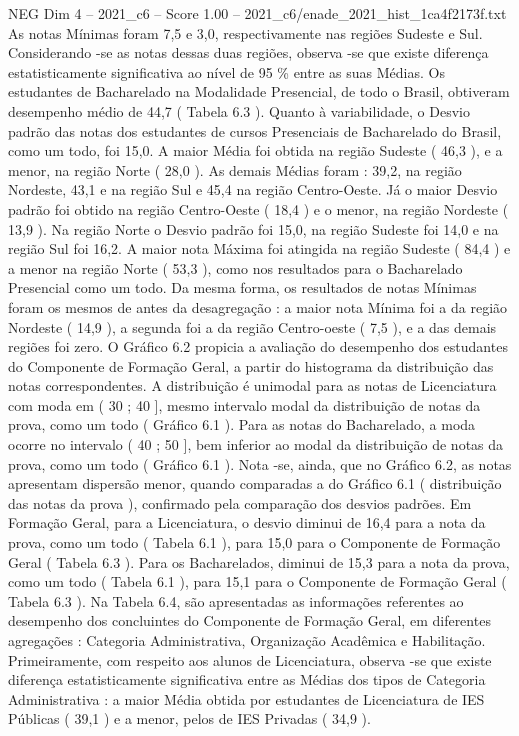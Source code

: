 \begin{textsample}{NEG Dim 4 – 2021\_c6 – Score 1.00 – 2021\_c6/enade\_2021\_hist\_1ca4f2173f.txt}
As notas Mínimas foram 7,5 e 3,0, respectivamente nas regiões Sudeste e Sul.
Considerando -se as notas dessas duas regiões, observa -se que existe diferença estatisticamente significativa ao nível de 95 \% entre as suas Médias.
Os estudantes de Bacharelado na Modalidade Presencial, de todo o Brasil, obtiveram desempenho médio de 44,7 ( Tabela 6.3 ).
Quanto à variabilidade, o Desvio padrão das notas dos estudantes de cursos Presenciais de Bacharelado do Brasil, como um todo, foi 15,0.
A maior Média foi obtida na região Sudeste ( 46,3 ), e a menor, na região Norte ( 28,0 ).
As demais Médias foram : 39,2, na região Nordeste, 43,1 e na região Sul e 45,4 na região Centro-Oeste.
Já o maior Desvio padrão foi obtido na região Centro-Oeste ( 18,4 ) e o menor, na região Nordeste ( 13,9 ).
Na região Norte o Desvio padrão foi 15,0, na região Sudeste foi 14,0 e na região Sul foi 16,2.
A maior nota Máxima foi atingida na região Sudeste ( 84,4 ) e a menor na região Norte ( 53,3 ), como nos resultados para o Bacharelado Presencial como um todo.
Da mesma forma, os resultados de notas Mínimas foram os mesmos de antes da desagregação : a maior nota Mínima foi a da região Nordeste ( 14,9 ), a segunda foi a da região Centro-oeste ( 7,5 ), e a das demais regiões foi zero.
O Gráfico 6.2 propicia a avaliação do desempenho dos estudantes do Componente de Formação Geral, a partir do histograma da distribuição das notas correspondentes.
A distribuição é unimodal para as notas de Licenciatura com moda em ( 30 ; 40 ], mesmo intervalo modal da distribuição de notas da prova, como um todo ( Gráfico 6.1 ).
Para as notas do Bacharelado, a moda ocorre no intervalo ( 40 ; 50 ], bem inferior ao modal da distribuição de notas da prova, como um todo ( Gráfico 6.1 ).
Nota -se, ainda, que no Gráfico 6.2, as notas apresentam dispersão menor, quando comparadas a do Gráfico 6.1 ( distribuição das notas da prova ), confirmado pela comparação dos desvios padrões.
Em Formação Geral, para a Licenciatura, o desvio diminui de 16,4 para a nota da prova, como um todo ( Tabela 6.1 ), para 15,0 para o Componente de Formação Geral ( Tabela 6.3 ).
Para os Bacharelados, diminui de 15,3 para a nota da prova, como um todo ( Tabela 6.1 ), para 15,1 para o Componente de Formação Geral ( Tabela 6.3 ).
Na Tabela 6.4, são apresentadas as informações referentes ao desempenho dos concluintes do Componente de Formação Geral, em diferentes agregações : Categoria Administrativa, Organização Acadêmica e Habilitação.
Primeiramente, com respeito aos alunos de Licenciatura, observa -se que existe diferença estatisticamente significativa entre as Médias dos tipos de Categoria Administrativa : a maior Média obtida por estudantes de Licenciatura de IES Públicas ( 39,1 ) e a menor, pelos de IES Privadas ( 34,9 ).

\end{textsample}
